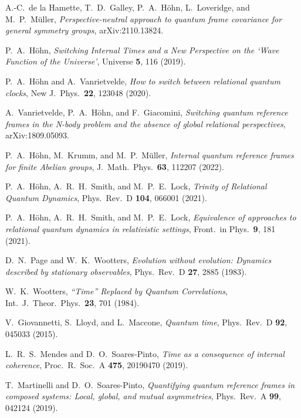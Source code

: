 \documentclass[aps,10pt,twocolumn,showpacs,pra,citeautoscript,amsmath,amssymb,floatfix,superscriptaddress]{revtex4-1}
\begin{document}
\begin{thebibliography}{47}
A.-C.\ de la Hamette, T.\ D.\ Galley, P.\ A.\ H\"ohn, L.\ Loveridge, and M.\ P.\ M\"uller, \emph{Perspective-neutral approach to quantum frame covariance for general symmetry groups}, arXiv:2110.13824.

P.\ A.\ H\"ohn, \emph{Switching Internal Times and a New Perspective on the `Wave Function of the Universe'}, Universe \textbf{5}, 116 (2019).

P.\ A.\ H\"ohn and A.\ Vanrietvelde, \emph{How to switch between relational quantum clocks}, New J.\ Phys.\ \textbf{22}, 123048 (2020).

A.\ Vanrietvelde, P.\ A.\ H\"ohn, and F.\ Giacomini, \emph{Switching quantum reference frames in the N-body problem and the absence of global relational perspectives}, arXiv:1809.05093.

P.\ A.\ H\"ohn, M.\ Krumm, and M.\ P.\ M\"uller, \emph{Internal quantum reference frames for finite Abelian groups}, J.\ Math.\ Phys.\ \textbf{63}, 112207 (2022).

P.\ A.\ H\"ohn, A.\ R.\ H.\ Smith, and M.\ P.\ E.\ Lock, \emph{Trinity of Relational Quantum Dynamics}, Phys.\ Rev.\ D \textbf{104}, 066001 (2021).

P.\ A.\ H\"ohn, A.\ R.\ H.\ Smith, and M.\ P.\ E.\ Lock, \emph{Equivalence of approaches to relational quantum dynamics in relativistic settings}, Front.\ in Phys.\ \textbf{9}, 181 (2021).

D.\ N.\ Page and W.\ K.\ Wootters, \emph{Evolution without evolution: Dynamics described by stationary observables}, Phys.\ Rev.\ D \textbf{27}, 2885 (1983).

W.\ K.\ Wootters, \emph{``Time'' Replaced by Quantum Correlations}, Int.\ J.\ Theor.\ Phys.\ \textbf{23}, 701 (1984).

V.\ Giovannetti, S.\ Lloyd, and L.\ Maccone, \emph{Quantum time}, Phys.\ Rev.\ D \textbf{92}, 045033 (2015).

L.\ R.\ S.\ Mendes and D.\ O.\ Soares-Pinto, \emph{Time as a consequence of internal coherence}, Proc.\ R.\ Soc.\ A \textbf{475}, 20190470 (2019).

T.\ Martinelli and D.\ O.\ Soares-Pinto, \emph{Quantifying quantum reference frames in composed systems: Local, global, and mutual asymmetries}, Phys.\ Rev.\ A \textbf{99}, 042124 (2019).


\end{thebibliography}
\end{document}
